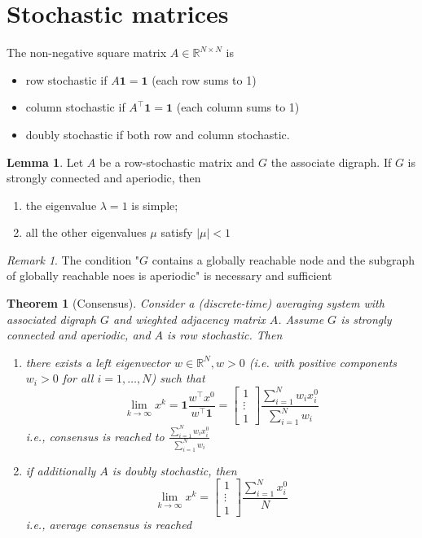 \documentclass{book}
\newcommand{\R}{\mathbb{R}}
\theoremstyle{theoremv2}
\newtheorem{theorem}{Theorem}[chapter]
\theoremstyle{defv2}
\theoremstyle{remark}
\newtheorem*{remark}{Remark}
\theoremstyle{remark}
\theoremstyle{definition}
\newtheorem*{lemma}{Lemma}
\theoremstyle{definition}
\begin{document}
\section{Stochastic matrices}
The non-negative square matrix $A\in\R^{N\times N}$ is 
\begin{itemize}
    \item row stochastic if $A\mathbf{1}=\mathbf{1}$ (each row sums to 1)
    \item column stochastic if $A^\top \mathbf{1}=\mathbf{1}$ (each column sums to 1)
    \item doubly stochastic if both row and column stochastic.
\end{itemize}
\begin{lemma}
    Let $A$ be a row-stochastic matrix and $G$ the associate digraph. If $G$ is strongly connected and aperiodic, then 
    \begin{enumerate}
        \item the eigenvalue $\lambda=1$ is simple; 
        \item all the other eigenvalues $\mu$ satisfy $|\mu|<1$
    \end{enumerate}
\end{lemma}
\begin{remark}
    The condition "$G$ contains a globally reachable node and the subgraph of globally reachable noes is aperiodic" is necessary and sufficient
\end{remark}
\begin{theorem}[Consensus]
    Consider a (discrete-time) averaging system with associated digraph $G$ and wieghted adjacency matrix $A$. Assume $G$ is strongly connected and aperiodic, and $A$ is row stochastic. Then 
    \begin{enumerate}
        \item there exists a left eigenvector $w\in\R^N,w>0$ (i.e. with positive components $w_i>0$ for all $i=1,\dots,N$) such that 
            \[
                \lim_{k\to\infty}x^k = \mathbf{1}\displaystyle\frac{w^\top x^0}{w^\top \mathbf{1}} = \begin{bmatrix}
                    1 \\ \vdots \\ 1
                \end{bmatrix} \displaystyle\frac{\sum_{i=1}^{N}w_ix_i^0}{\sum_{i=1}^{N}w_i}
            \]
            i.e., consensus is reached to $ \displaystyle\frac{\sum_{i=1}^{N}w_ix_i^0}{\sum_{i=1}^{N}w_i}$
        \item if additionally $A$ is doubly stochastic, then 
            \[
                \lim_{k\to\infty}x^k = \begin{bmatrix}
                    1 \\ \vdots \\ 1
                \end{bmatrix} \displaystyle\frac{\sum_{i=1}^{N}x_i^0}{N}
            \]
            i.e., average consensus is reached
    \end{enumerate}
\end{theorem}
\end{document}
